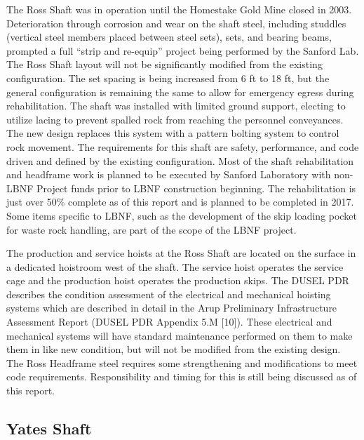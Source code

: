 The Ross Shaft was in operation until the Homestake Gold Mine closed in 2003. Deterioration through corrosion and wear on the shaft steel, including studdles (vertical steel members placed between steel sets), sets, and bearing beams, prompted a full “strip and re-equip” project being performed by the Sanford Lab. The Ross Shaft layout will not be significantly modified from the existing configuration. The set spacing is being increased from 6 ft to 18 ft, but the general configuration is remaining the same to allow for emergency egress during rehabilitation. The shaft was installed with limited ground support, electing to utilize lacing to prevent spalled rock from reaching the personnel conveyances. The new design replaces this system with a pattern bolting system to control rock movement. The requirements for this shaft are safety, performance, and code driven and defined by the existing configuration. Most of the shaft rehabilitation and headframe work is planned to be executed by Sanford Laboratory with non-LBNF Project funds prior to LBNF construction beginning. The rehabilitation is just over 50\% complete as of this report and is planned to be completed in 2017.  Some items specific to LBNF, such as the development of the skip loading pocket for waste rock handling, are part of the scope of the LBNF project.

The production and service hoists at the Ross Shaft are located on the surface in a dedicated hoistroom west of the shaft. The service hoist operates the service cage and the production hoist operates the production skips. The DUSEL PDR describes the condition assessment of the electrical and mechanical hoisting systems which are described in detail in the Arup Preliminary Infrastructure Assessment Report (DUSEL PDR Appendix 5.M [10]). These electrical and mechanical systems will have standard maintenance performed on them to make them in like new condition, but will not be modified from the existing design. The Ross Headframe steel requires some strengthening and modifications to meet code requirements.  Responsibility and timing for this is still being discussed as of this report.

\subsection{Yates Shaft}
\label{sec:fscf-und-shafts-yates}

